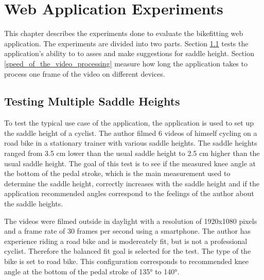 

\chapter{Web Application Experiments}
\label{experiments}

This chapter describes the experiments done to evaluate the bikefitting web application. The experiments are divided into two parts. Section \ref{assesment_of_multiple_saddle_heights} tests the application's ability to to asses and make suggestions for saddle height. Section \ref{speed_of_the_video_processing} measure how long the application takes to process one frame of the video on different devices.

\section{Testing Multiple Saddle Heights}
\label{assesment_of_multiple_saddle_heights}
To test the typical use case of the application, the application is used to set up the saddle height of a cyclist. The author filmed 6 videos of himself cycling on a road bike in a stationary trainer with various saddle heights. The saddle heights ranged from 3.5 cm lower than the usual saddle height to 2.5 cm higher than the usual saddle height. The goal of this test is to see if the measured knee angle at the bottom of the pedal stroke, which is the main measurement used to determine the saddle height, correctly increases with the saddle height and if the application recommended angles correspond to the feelings of the author about the saddle heights.

The videos were filmed outside in daylight with a resolution of 1920x1080 pixels and a frame rate of 30 frames per second using a smartphone. The author has experience riding a road bike and is modereately fit, but is not a professional cyclist. Therefore the balanced fit goal is selected for the test. The type of the bike is set to road bike. This configuration corresponds to recommended knee angle at the bottom of the pedal stroke of 135° to 140°.




